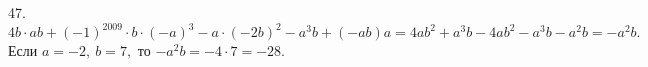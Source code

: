 47. $4b\cdot ab+(-1)^{2009}\cdot b\cdot(-a)^3-a\cdot(-2b)^2-a^3b+(-ab)a=4ab^2+a^3b-4ab^2-a^3b-a^2b=-a^2b.$ Если $a=-2,\ b=7,$ то
$-a^2b=-4\cdot7=-28.$\\
